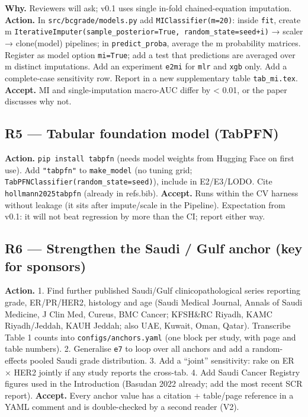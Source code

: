 \documentclass[
  10pt,
]{article}
\begin{document}
\textbf{Why.} Reviewers will ask; v0.1 uses single in-fold
chained-equation imputation. \textbf{Action.} In
\texttt{src/bcgrade/models.py} add \texttt{MIClassifier(m=20)}: inside
\texttt{fit}, create m
\texttt{IterativeImputer(sample\_posterior=True,\ random\_state=seed+i)}
→ scaler → clone(model) pipelines; in \texttt{predict\_proba}, average
the m probability matrices. Register as model option \texttt{mi=True};
add a test that predictions are averaged over m distinct imputations.
Add an experiment \texttt{e2mi} for \texttt{mlr} and \texttt{xgb} only.
Add a complete-case sensitivity row. Report in a new supplementary table
\texttt{tab\_mi.tex}. \textbf{Accept.} MI and single-imputation
macro-AUC differ by \textless{} 0.01, or the paper discusses why not.

\hypertarget{r5-tabular-foundation-model-tabpfn}{%
\subsection{R5 --- Tabular foundation model
(TabPFN)}\label{r5-tabular-foundation-model-tabpfn}}

\textbf{Action.} \texttt{pip\ install\ tabpfn} (needs model weights from
Hugging Face on first use). Add \texttt{"tabpfn"} to
\texttt{make\_model} (no tuning grid;
\texttt{TabPFNClassifier(random\_state=seed)}), include in E2/E3/LODO.
Cite \texttt{hollmann2025tabpfn} (already in refs.bib). \textbf{Accept.}
Runs within the CV harness without leakage (it sits after impute/scale
in the Pipeline). Expectation from v0.1: it will not beat regression by
more than the CI; report either way.

\hypertarget{r6-strengthen-the-saudi-gulf-anchor-key-for-sponsors}{%
\subsection{R6 --- Strengthen the Saudi / Gulf anchor (key for
sponsors)}\label{r6-strengthen-the-saudi-gulf-anchor-key-for-sponsors}}

\textbf{Action.} 1. Find further published Saudi/Gulf
clinicopathological series reporting grade, ER/PR/HER2, histology and
age (Saudi Medical Journal, Annals of Saudi Medicine, J Clin Med,
Cureus, BMC Cancer; KFSH\&RC Riyadh, KAMC Riyadh/Jeddah, KAUH Jeddah;
also UAE, Kuwait, Oman, Qatar). Transcribe Table 1 counts into
\texttt{configs/anchors.yaml} (one block per study, with page and table
numbers). 2. Generalise \texttt{e7} to loop over all anchors and add a
random-effects pooled Saudi grade distribution. 3. Add a ``joint''
sensitivity: rake on ER × HER2 jointly if any study reports the
cross-tab. 4. Add Saudi Cancer Registry figures used in the Introduction
(Basudan 2022 already; add the most recent SCR report). \textbf{Accept.}
Every anchor value has a citation + table/page reference in a YAML
comment and is double-checked by a second reader (V2).
\end{document}
